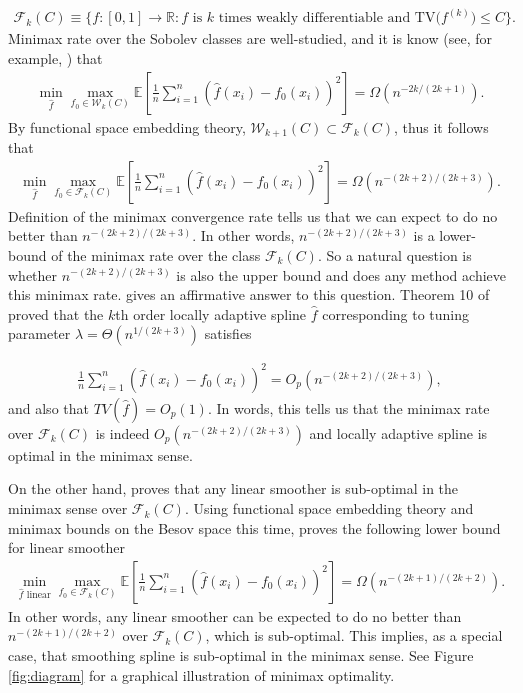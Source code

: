 \documentclass[a4paper]{article}
\newcommand{\RR}{\mathbb{R}}
\renewcommand{\cal}{\mathcal}
\newcommand{\E}{\mathbb{E}}
\begin{document}
\begin{align*}
\cal{F}_k(C) \equiv \{f:[0, 1]\rightarrow \RR: f \text{ is $k$ times weakly differentiable and TV($f^{(k)}$)$\leq C$}\}.
\end{align*}
Minimax rate over the Sobolev classes are well-studied, and it is know (see, for example, \cite{nussbaum1985spline}) that
\begin{align*}
\min_{\hat{f}}\max_{f_0\in\cal{W}_k(C)} \E[\frac{1}{n}\sum_{i=1}^n(\hat{f}(x_i)-f_0(x_i))^2] = \Omega(n^{-2k/(2k+1)}).
\end{align*}
By functional space embedding theory, $\cal{W}_{k+1}(C)\subset \cal{F}_k(C)$, thus it follows that
\begin{align*}
\min_{\hat{f}}\max_{f_0\in\cal{F}_k(C)}\E[\frac{1}{n}\sum_{i=1}^n(\hat{f}(x_i)-f_0(x_i))^2] = \Omega(n^{-(2k+2)/(2k+3)}).
\end{align*}
Definition of the minimax convergence rate tells us that we can expect to do no better than $n^{-(2k+2)/(2k+3)}$. In other words, $n^{-(2k+2)/(2k+3)}$ is a lower-bound of the minimax rate over the class $\cal{F}_k(C)$. So a natural question is whether $n^{-(2k+2)/(2k+3)}$ is also the upper bound and does any method achieve this minimax rate. \cite{mammen1997locally} gives an affirmative answer to this question. Theorem 10 of \cite{mammen1997locally} proved that the $k$th order locally adaptive spline $\hat{f}$ corresponding to tuning parameter $\lambda=\Theta(n^{1/(2k+3)})$ satisfies

\begin{align*}
\frac{1}{n}\sum_{i=1}^n (\hat{f}(x_i)-f_0(x_i))^2 = O_p(n^{-(2k+2)/(2k+3)}),
\end{align*}
and also that $TV(\hat{f}) = O_p(1)$. In words, this tells us that the minimax rate over $\cal{F}_k(C)$ is indeed $O_p(n^{-(2k+2)/(2k+3)})$ and locally adaptive spline is optimal in the minimax sense. 

On the other hand, \cite{donoho1998minimax} proves that any linear smoother is sub-optimal in the minimax sense over $\cal{F}_k(C)$. Using functional space embedding theory and minimax bounds on the Besov space this time, \cite{donoho1998minimax} proves the following lower bound for linear smoother
\begin{align*}
\min_{\hat{f}\text{ linear}}\max_{f_0\in\cal{F}_k(C)} \E[\frac{1}{n}\sum_{i=1}^n (\hat{f}(x_i) - f_0(x_i))^2] = \Omega(n^{-(2k+1)/(2k+2)}).
\end{align*}
In other words, any linear smoother can be expected to do no better than $n^{-(2k+1)/(2k+2)}$ over $\cal{F}_k(C)$, which is sub-optimal. This implies, as a special case, that smoothing spline is sub-optimal in the minimax sense. See Figure \ref{fig:diagram} for a graphical illustration of minimax optimality.
\end{document}
